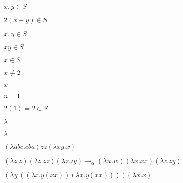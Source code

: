 \documentclass[10pt]{book}
\begin{document}
\begin{mdSnippets}
\begin{mdInlineSnippet}%
$x,y \in S$\end{mdInlineSnippet}%
\begin{mdInlineSnippet}[6338e2a865b2a588ab4cf36c8edb1d85]%
$2(x+y) \in S$\end{mdInlineSnippet}%
\begin{mdInlineSnippet}%
$x,y \in S$\end{mdInlineSnippet}%
\begin{mdInlineSnippet}[94ab0a60ff9cfe6ad27f8238d7e0f075]%
$xy \in S$\end{mdInlineSnippet}%
\begin{mdInlineSnippet}%
$x \in S$\end{mdInlineSnippet}%
\begin{mdInlineSnippet}%
$x \not=2$\end{mdInlineSnippet}%
\begin{mdInlineSnippet}[9dd4e461268c8034f5c8564e155c67a6]%
$x$\end{mdInlineSnippet}%
\begin{mdInlineSnippet}[ab78ccfbcd04b1ba22eb9427251cb20d]%
$n = 1$\end{mdInlineSnippet}%
\begin{mdInlineSnippet}[0a3fa767ea18492ebaf704c7b43ca24a]%
$2(1) = 2 \in S$\end{mdInlineSnippet}%
\begin{mdInlineSnippet}[c6a6eb61fd9c6c913da73b3642ca147d]%
$\lambda$\end{mdInlineSnippet}%
\begin{mdInlineSnippet}[c6a6eb61fd9c6c913da73b3642ca147d]%
$\lambda$\end{mdInlineSnippet}%
\begin{mdInlineSnippet}[cfc915c377fa8c61b8843b4fd24c1b9e]%
$(\lambda a b c . c b a)zz(\lambda x y . x)$\end{mdInlineSnippet}%
\begin{mdInlineSnippet}[8fc4f248b988d18586f039464df23311]%
$(\lambda z . z)(\lambda z . z z)(\lambda z . z y) \rightarrow_\alpha (\lambda w . w)(\lambda x . x x) (\lambda z . z y)$\end{mdInlineSnippet}%
\begin{mdInlineSnippet}%
$(\lambda y. ((\lambda x. y(xx)) (\lambda x. y(xx)))) (\lambda x.x)$\end{mdInlineSnippet}%

\end{mdSnippets}
\end{document}
